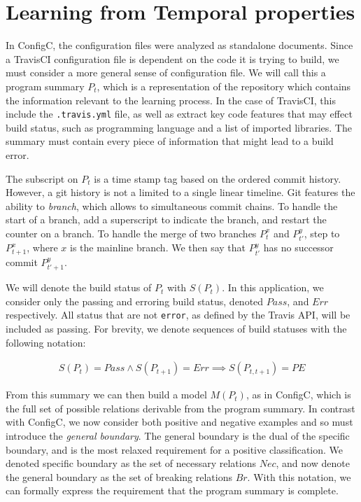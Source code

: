 \section{Learning from Temporal properties}


In ConfigC, the configuration files were analyzed as standalone documents.
Since a TravisCI configuration file is dependent on the code it is trying to build, we must consider a more general sense of configuration file.
We will call this a program summary $P_t$, which is a representation of the repository which contains the information relevant to the learning process.
In the case of TravisCI, this include the \verb|.travis.yml| file, as well as extract key code features that may effect build status, such as programming language and a list of imported libraries.
The summary must contain every piece of information that might lead to a build error.

The subscript on $P_t$ is a time stamp tag based on the ordered commit history.
However, a git history is not a limited to a single linear timeline.
Git features the ability to \textit{branch}, which allows to simultaneous commit chains.
To handle the start of a branch, add a superscript to indicate the branch, and restart the counter on a branch.
To handle the merge of two branches $P_{t}^{x}$ and $P_{t'}^{y}$, step to $P_{t+1}^{x}$, where $x$ is the mainline branch.
We then say that $P_{t'}^{y}$ has no successor commit $P_{t'+1}^{y}$.

We will denote the build status of $P_t$ with $S(P_t)$.
In this application, we consider only the passing and erroring build status, denoted $Pass$, and $Err$ respectively.
All status that are not \verb|error|, as defined by the Travis API, will be included as passing.
For brevity, we denote sequences of build statuses with the following notation:

\begin{align*}
  S(P_t)=Pass \land S(P_{t+1})=Err \implies S(P_{t,t+1}) = PE
\end{align*}

From this summary we can then build a model $M(P_t)$, as in ConfigC, which is the full set of possible relations derivable from the program summary.
In contrast with ConfigC, we now consider both positive and negative examples and so must introduce the \textit{general boundary}.
The general boundary is the dual of the specific boundary, and is the most relaxed requirement for a positive classification.
We denoted specific boundary as the set of necessary relations $Nec$, and now denote the general boundary as the set of breaking relations $Br$.
With this notation, we can formally express the requirement that the program summary is complete.

